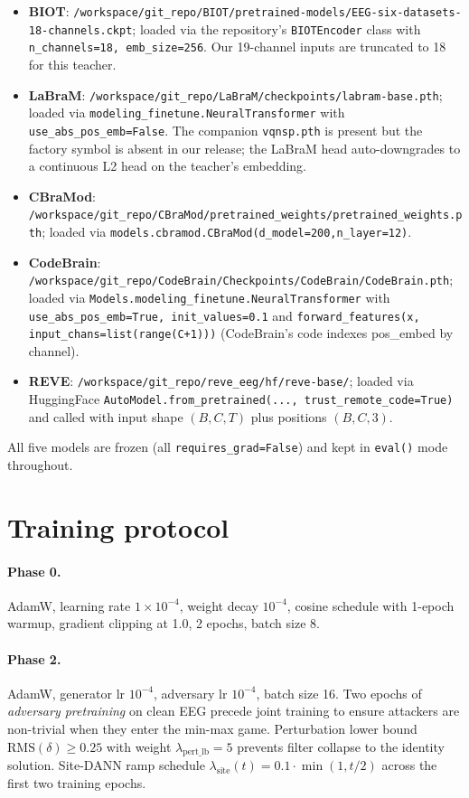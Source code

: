\begin{itemize}[leftmargin=*,topsep=0pt,itemsep=0pt]
\item \textbf{BIOT}: \texttt{/workspace/git\_repo/BIOT/pretrained-models/EEG-six-datasets-18-channels.ckpt}; loaded via the repository's \texttt{BIOTEncoder} class with \texttt{n\_channels=18, emb\_size=256}. Our 19-channel inputs are truncated to 18 for this teacher.
\item \textbf{LaBraM}: \texttt{/workspace/git\_repo/LaBraM/checkpoints/labram-base.pth}; loaded via \texttt{modeling\_finetune.NeuralTransformer} with \texttt{use\_abs\_pos\_emb=False}. The companion \texttt{vqnsp.pth} is present but the factory symbol is absent in our release; the LaBraM head auto-downgrades to a continuous L2 head on the teacher's embedding.
\item \textbf{CBraMod}: \texttt{/workspace/git\_repo/CBraMod/pretrained\_weights/pretrained\_weights.pth}; loaded via \texttt{models.cbramod.CBraMod(d\_model=200,n\_layer=12)}.
\item \textbf{CodeBrain}: \texttt{/workspace/git\_repo/CodeBrain/Checkpoints/CodeBrain/CodeBrain.pth}; loaded via \texttt{Models.modeling\_finetune.NeuralTransformer} with \texttt{use\_abs\_pos\_emb=True, init\_values=0.1} and \texttt{forward\_features(x, input\_chans=list(range(C+1)))} (CodeBrain's code indexes pos\_embed by channel).
\item \textbf{REVE}: \texttt{/workspace/git\_repo/reve\_eeg/hf/reve-base/}; loaded via HuggingFace \texttt{AutoModel.from\_pretrained(..., trust\_remote\_code=True)} and called with input shape $(B,C,T)$ plus positions $(B,C,3)$.
\end{itemize}
All five models are frozen (all \texttt{requires\_grad=False}) and kept in \texttt{eval()} mode throughout.

\section{Training protocol}
\label{app:training}

\paragraph{Phase 0.} AdamW, learning rate $1\!\times\!10^{-4}$, weight decay $10^{-4}$, cosine schedule with 1-epoch warmup, gradient clipping at 1.0, 2 epochs, batch size 8.

\paragraph{Phase 2.} AdamW, generator lr $10^{-4}$, adversary lr $10^{-4}$, batch size 16. Two epochs of \emph{adversary pretraining} on clean EEG precede joint training to ensure attackers are non-trivial when they enter the min-max game. Perturbation lower bound $\mathrm{RMS}(\delta)\!\ge\!0.25$ with weight $\lambda_{\text{pert\_lb}}\!=\!5$ prevents filter collapse to the identity solution. Site-DANN ramp schedule $\lambda_{\text{site}}(t)\!=\!0.1\cdot\min(1,t/2)$ across the first two training epochs.

